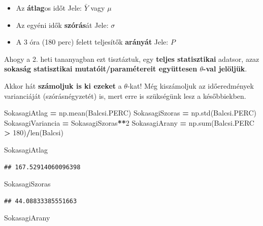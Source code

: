 \documentclass[
]{book}
\newenvironment{Shaded}{\begin{snugshade}}{\end{snugshade}}
\newcommand{\BuiltInTok}[1]{#1}
\newcommand{\DecValTok}[1]{\textcolor[rgb]{0.00,0.00,0.81}{#1}}
\newcommand{\NormalTok}[1]{#1}
\newcommand{\OperatorTok}[1]{\textcolor[rgb]{0.81,0.36,0.00}{\textbf{#1}}}
\providecommand{\tightlist}{%
  \setlength{\itemsep}{0pt}\setlength{\parskip}{0pt}}
\begin{document}
\begin{itemize}
\tightlist
\item
  Az \textbf{átlag}os időt Jele: \(\bar{Y}\) vagy \(\mu\)
\item
  Az egyéni idők \textbf{szórás}át Jele: \(\sigma\)
\item
  A 3 óra (180 perc) felett teljesítők \textbf{arányát} Jele: \(P\)
\end{itemize}

Ahogy a 2. heti tananyagban ezt tisztáztuk, egy \textbf{teljes statisztikai} adatsor, azaz \textbf{sokaság statisztikai mutatóit/paramétereit együttesen \(\theta\)-val jelöljük}.

Akkor hát \textbf{számoljuk is ki ezeket} a \(\theta\)-kat! Még kiszámoljuk az időeredmények varianciáját (szórásnégyzetét) is, mert erre is szükségünk lesz a későbbiekben.

\begin{Shaded}
\begin{Highlighting}[]
\NormalTok{SokasagiAtlag }\OperatorTok{=}\NormalTok{ np.mean(Balcsi.PERC)}
\NormalTok{SokasagiSzoras }\OperatorTok{=}\NormalTok{ np.std(Balcsi.PERC)}
\NormalTok{SokasagiVariancia }\OperatorTok{=}\NormalTok{ SokasagiSzoras}\OperatorTok{**}\DecValTok{2}
\NormalTok{SokasagiArany }\OperatorTok{=}\NormalTok{ np.}\BuiltInTok{sum}\NormalTok{(Balcsi.PERC }\OperatorTok{\textgreater{}} \DecValTok{180}\NormalTok{)}\OperatorTok{/}\BuiltInTok{len}\NormalTok{(Balcsi)}

\NormalTok{SokasagiAtlag}
\end{Highlighting}
\end{Shaded}

\begin{verbatim}
## 167.52914060096398
\end{verbatim}

\begin{Shaded}
\begin{Highlighting}[]
\NormalTok{SokasagiSzoras}
\end{Highlighting}
\end{Shaded}

\begin{verbatim}
## 44.08833385551663
\end{verbatim}

\begin{Shaded}
\begin{Highlighting}[]
\NormalTok{SokasagiArany}
\end{Highlighting}
\end{Shaded}
\end{document}
